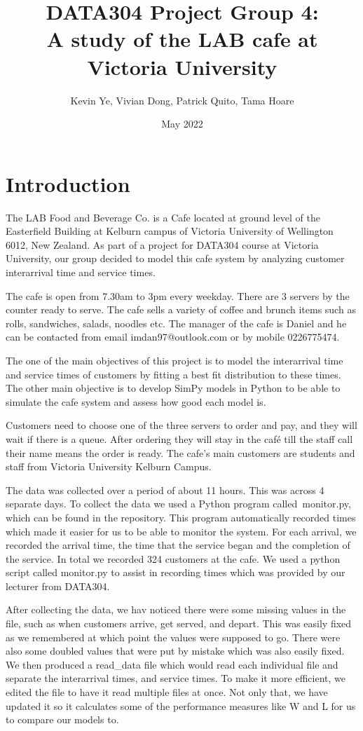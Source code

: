 \documentclass{article}
\title{\Huge DATA304 Project Group 4:\\
  \Huge A study of the LAB cafe at Victoria University}
\author{\Large Kevin Ye, Vivian Dong, Patrick Quito, Tama Hoare }
\date{\Large May 2022}
\begin{document}
\maketitle
\newpage

\section{Introduction}

The LAB Food and Beverage Co. is a Cafe located at ground level of the Easterfield Building at Kelburn campus of Victoria University of Wellington 6012, New Zealand. As part of a project for DATA304 course at Victoria University, our group decided to model this cafe system by analyzing customer interarrival time and service times. 

The cafe is open from 7.30am to 3pm every weekday. There are 3 servers by the counter ready to serve. The cafe sells a variety of coffee and brunch items such as rolls, sandwiches, salads, noodles etc. The manager of the cafe is Daniel and he can be contacted from email imdan97@outlook.com or by mobile 0226775474.

The one of the main objectives of this project is to model the interarrival time and service times of customers by fitting a best fit distribution to these times. The other main objective is to develop SimPy models in Python to be able to simulate the cafe system and assess how good each model is.

Customers need to choose one of the three servers to order and pay, and they will wait if there is a queue. After ordering they will stay in the café till the staff call their name means the order is ready. The cafe's main customers are students and staff from Victoria University Kelburn Campus. 

The data was collected over a period of about 11 hours. This was across 4 separate days. To collect the data we used a Python program called monitor.py, which can be found in the repository. This program automatically recorded times which made it easier for us to be able to monitor the system. For each arrival, we recorded the arrival time, the time that the service began and the completion of the service. In total we recorded 324 customers at the cafe. We used a python script called monitor.py to assist in recording times which was provided by our lecturer\cite{monitor} from DATA304.

After collecting the data, we hav noticed there were some missing values in the file, such as when customers arrive, get served, and depart. This was easily fixed as we remembered at which point the values were supposed to go. There were also some doubled values that were put by mistake which was also easily fixed. We then produced a read\_data file which would read each individual file and separate the interarrival times, and service times. To make it more efficient, we edited the file to have it read multiple files at once. Not only that, we have updated it so it calculates some of the performance measures like W and L for us to compare our models to.
\end{document}
